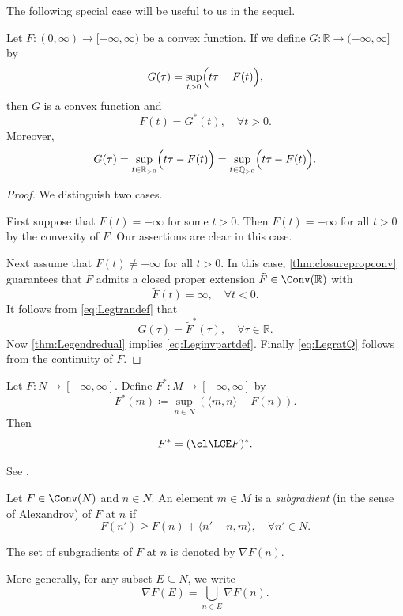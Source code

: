 The following special case will be useful to us in the sequel.
\begin{corollary}\label{cor:Leginvpartdef}
    Let $F\colon (0,\infty)\rightarrow [-\infty,\infty)$ be a convex function. If we define $G\colon \mathbb{R}\rightarrow (-\infty,\infty]$ by
    \[
        G(\tau)=\sup_{t>0} \Bigl( t\tau-F(t) \Bigr),
    \]
    then $G$ is a convex function and
    \begin{equation}\label{eq:Leginvpartdef}
    F(t)=G^*(t),\quad \forall t>0.
    \end{equation}
    Moreover,
    \begin{equation}\label{eq:LegratQ}
        G(\tau)=\sup_{t\in \mathbb{R}_{>0}} \Bigl( t\tau-F(t) \Bigr)=\sup_{t\in \mathbb{Q}_{>0}} \Bigl( t\tau-F(t) \Bigr).
    \end{equation}
\end{corollary}
\begin{proof}
    We distinguish two cases.

    First suppose that $F(t)=-\infty$ for some $t>0$. Then $F(t)=-\infty$ for all $t>0$ by the convexity of $F$. Our assertions are clear in this case.

    Next assume that $F(t)\neq -\infty$ for all $t>0$. In this case, \cref{thm:closurepropconv} guarantees that $F$ admits a closed proper extension $\tilde{F}\in \Conv(\mathbb{R})$ with
    \[
    \tilde{F}(t)=\infty,\quad \forall t<0.
    \]
    It follows from \eqref{eq:Legtrandef} that
    \[
    G(\tau)=\tilde{F}^*(\tau),\quad \forall \tau\in \mathbb{R}.
    \]
    Now \cref{thm:Legendredual} implies \eqref{eq:Leginvpartdef}. Finally \eqref{eq:LegratQ} follows from the continuity of $F$.
\end{proof}


\begin{proposition}\label{prop:Legnonconvex}
    Let $F\colon N\rightarrow [-\infty,\infty]$. Define $F^*\colon M\rightarrow [-\infty,\infty]$ by
    \[
    F^*(m)\coloneqq \sup_{n\in N} \left( \langle m,n \rangle -F(n) \right).
    \]
    Then
    \[
    F^*=(\cl \LCE F)^*.
    \]
\end{proposition}
See \cite[Corollary~12.1.1]{Roc70}.

\begin{definition}\label{def:subgrad}
    Let $F\in \Conv(N)$ and $n\in N$. An element $m\in M$ is a \emph{subgradient} (in the sense of Alexandrov) of $F$ at $n$ if
    \begin{equation}\label{eq:subgrad}
    F(n')\geq F(n)+\langle n'-n,m \rangle,\quad \forall n'\in N.
    \end{equation}

    The set of subgradients of $F$ at $n$ is denoted by $\nabla F(n)$.

    More generally, for any subset $E\subseteq N$, we write
    \[
        \nabla F(E)=\bigcup_{n\in E}\nabla F(n).
    \]
\end{definition}

